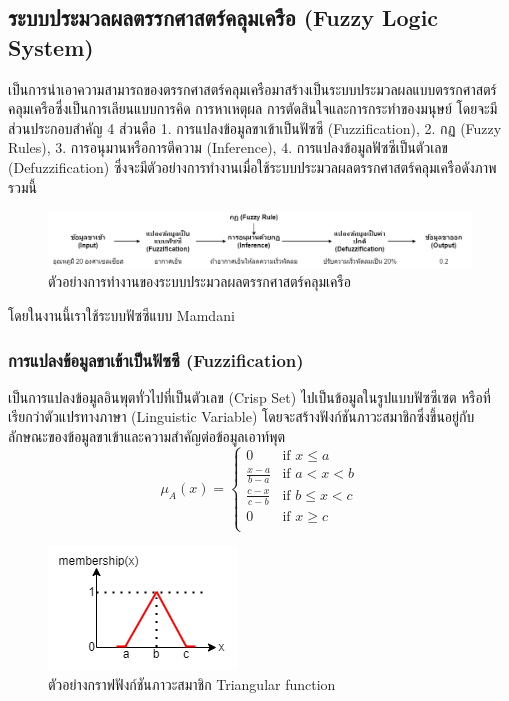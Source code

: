 \subsection{ระบบประมวลผลตรรกศาสตร์คลุมเครือ (Fuzzy Logic System)}
เป็นการนำเอาความสามารถของตรรกศาสตร์คลุมเครือมาสร้างเป็นระบบประมวลผลแบบตรรกศาสตร์คลุมเครือซึ่งเป็นการเลียนแบบการคิด การหาเหตุผล การตัดสินใจและการกระทำของมนุษย์ โดยจะมีส่วนประกอบสำคัญ 4 ส่วนคือ 1. การแปลงข้อมูลขาเข้าเป็นฟัซซี (Fuzzification), 2. กฏ (Fuzzy Rules), 3. การอนุมานหรือการตีความ (Inference), 4. การแปลงข้อมูลฟัซซีเป็นตัวเลข (Defuzzification)
ซึ่งจะมีตัวอย่างการทำงานเมื่อใช้ระบบประมวลผลตรรกศาสตร์คลุมเครือดังภาพรวมนี้
\begin{figure}[ht]
    \centering
    \includegraphics[scale=0.375]{images/ex_fis.png}
    \caption{ตัวอย่างการทำงานของระบบประมวลผลตรรกศาสตร์คลุมเครือ}
    \label{fig:2}
\end{figure}

โดยในงานนี้เราใช้ระบบฟัซซีแบบ Mamdani

\subsubsection{การแปลงข้อมูลขาเข้าเป็นฟัซซี (Fuzzification)}
เป็นการแปลงข้อมูลอินพุตทั่วไปที่เป็นตัวเลข (Crisp Set) ไปเป็นข้อมูลในรูปแบบฟัซซีเซต หรือที่เรียกว่าตัวแปรทางภาษา (Linguistic Variable) โดยจะสร้างฟังก์ชันภาวะสมาชิกซึ่งขึ้นอยู่กับลักษณะของข้อมูลขาเข้าและความสำคัญต่อข้อมูลเอาท์พุต
\begin{equation} \mu_A(x) = \begin{cases}
0 & \text{if } x \leq a \\
\frac{x-a}{b-a} & \text{if } a < x < b \\
\frac{c-x}{c-b} & \text{if } b \leq x < c \\
0 & \text{if } x \geq c \\
\end{cases} \end{equation}
\begin{figure}[ht]
    \centering
    \includegraphics[scale=0.7]{images/ex_memship.png}
    \caption{ตัวอย่างกราฟฟังก์ชันภาวะสมาชิก Triangular function}
    \label{fig:3}
\end{figure}

